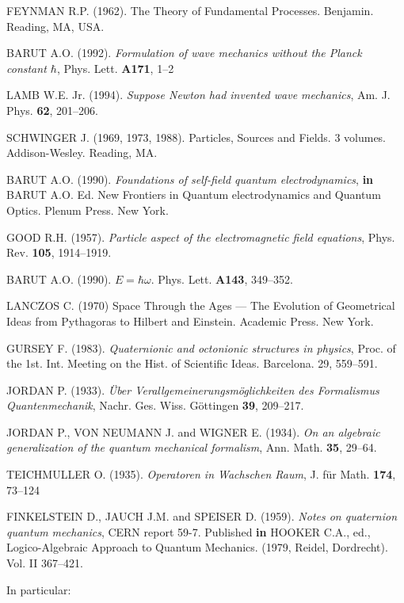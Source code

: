 \documentclass [12pt,a4paper      ]{article}
\begin{document}
\begin{enumerate}
  FEYNMAN  R.P.  (1962). The Theory  of  Fundamental  
Processes.  Benjamin. Reading, MA, USA.

  BARUT A.O.  (1992). \emph{Formulation of wave mechanics without  the Planck constant $\hbar$},  Phys. Lett.  {\bf  A171}, 1--2

  LAMB  W.E.  Jr.  (1994).  \emph{Suppose  Newton  had  invented  wave mechanics}, Am. J. Phys.   {\bf 62}, 201--206.

 SCHWINGER J. (1969, 1973, 1988).  Particles, Sources and Fields.  
3 volumes. Addison-Wesley. Reading, MA.

BARUT    A.O.     (1990).  \emph{Foundations    of    self-field 
quantum electrodynamics},  {\bf in}   BARUT  A.O.  Ed.   New  Frontiers  
in Quantum electrodynamics  and  Quantum Optics.   Plenum  Press.  New 
York.

   GOOD R.H. (1957). \emph{Particle aspect of the electromagnetic field equations}, Phys. Rev. {\bf 105}, 1914--1919.
 

 BARUT A.O. (1990). $E = \hbar \omega$.  Phys. Lett.   {\bf A143}, 349--352.

  LANCZOS C. (1970) Space Through the Ages --- The Evolution of Geometrical Ideas from Pythagoras to Hilbert and Einstein. Academic Press. New York.

  GURSEY  F.  (1983). \emph{Quaternionic and octonionic structures  in physics}, Proc. of the 1st. Int. Meeting on the Hist. of Scientific 
Ideas.  Barcelona.  29, 559--591.

  JORDAN P.  (1933). \emph{\"Uber  Verallgemeinerungsm\"oglichkeiten  des Formalismus Quantenmechanik},  Nachr.  Ges.  Wiss.   G\"ottingen   {\bf 39}, 
209--217.

 JORDAN P., VON NEUMANN J. and WIGNER E. (1934). \emph{On an 
algebraic generalization of the quantum mechanical formalism}, Ann. Math.  
 {\bf 35}, 29--64.

  TEICHMULLER O.  (1935). \emph{Operatoren in Wachschen Raum}, J.  
f\"ur Math.  {\bf 174}, 73--124

  FINKELSTEIN D.,  JAUCH J.M.  and SPEISER D.  (1959). \emph{Notes  on quaternion quantum mechanics}, CERN report 59-7. Published {\bf in}  
HOOKER C.A.,  ed., Logico-Algebraic   Approach  to  Quantum  Mechanics.  (1979, Reidel, Dordrecht). Vol. II  367--421.

 In particular: 


\end{enumerate}
\end{document}
